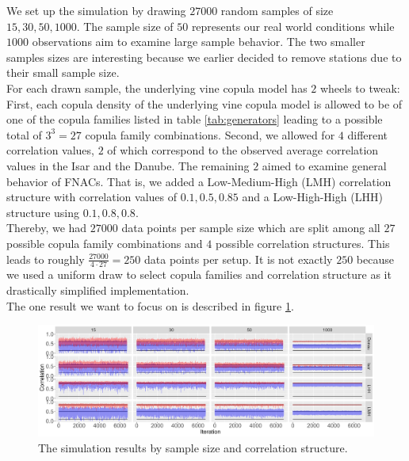 \documentclass[
]{krantz}
\begin{document}
We set up the simulation by drawing \(27000\) random samples of size \(15, 30, 50, 1000\).
The sample size of \(50\) represents our real world conditions while \(1000\) observations aim to examine large sample behavior. The two smaller samples sizes are interesting because we earlier decided to remove stations due to their small
sample size.\\
For each drawn sample,
the underlying vine copula model has \(2\) wheels to tweak:
First, each copula density
of the underlying vine copula model is allowed to be of one of the copula families
listed in table \ref{tab:generators} leading to a possible total of \(3^3 = 27\) copula family combinations.
Second, we allowed for \(4\) different correlation values, \(2\) of which correspond to the observed average
correlation values in the Isar and the Danube. The remaining \(2\) aimed to examine general behavior of FNACs. That is, we added a Low-Medium-High (LMH) correlation structure with correlation values of \(0.1, 0.5, 0.85\) and a
Low-High-High (LHH) structure using \(0.1, 0.8, 0.8\).\\
Thereby, we had \(27000\) data points per sample size which are split among all \(27\) possible copula family combinations
and \(4\) possible correlation structures. This leads to roughly \(\frac{27000}{4\cdot 27} = 250\) data points per setup.
It is not exactly \(250\) because we used a uniform draw to select copula families and correlation
structure as it drastically simplified implementation.\\
The one result we want to focus on is described in figure \ref{fig:simresults}.

\begin{figure}

{\centering \includegraphics[width=0.9\linewidth]{work/04-floodfreq/figures/sim_NAC_if_Vine_DPG} 

}

\caption{The simulation results by sample size and correlation structure.}\label{fig:simresults}
\end{figure}
\end{document}
